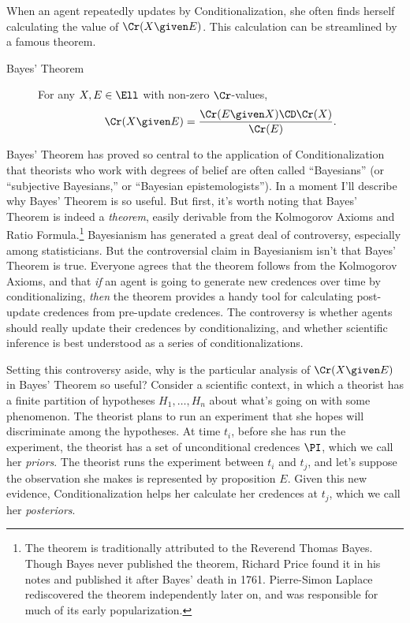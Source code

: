 When an agent repeatedly updates by Conditionalization, she often finds herself calculating the value of $\Cr(X \given E)$. This calculation can be streamlined by a famous theorem.
\begin{description}
\item[Bayes' Theorem]{For any $X, E \in \Ell$ with non-zero $\Cr$-values, $$\Cr(X \given E)=\frac{\Cr(E \given X) \CD \Cr(X)}{\Cr(E)}.$$}
\end{description}
Bayes' Theorem has proved so central to the application of Conditionalization that theorists who work with degrees of belief are often called ``Bayesians'' (or ``subjective Bayesians,'' or ``Bayesian epistemologists''). In a moment I'll describe why Bayes' Theorem is so useful. But first, it's worth noting that Bayes' Theorem is indeed a \emph{theorem}, easily derivable from the Kolmogorov Axioms and Ratio Formula.\footnote
{The theorem is traditionally attributed to the Reverend Thomas Bayes. Though Bayes never published the theorem, Richard Price found it in his notes and published it after Bayes' death in 1761. Pierre-Simon Laplace rediscovered the theorem independently later on, and was responsible for much of its early popularization.} 
 Bayesianism has generated a great deal of controversy, especially among statisticians. But the controversial claim in Bayesianism isn't that Bayes' Theorem is true. Everyone agrees that the theorem follows from the Kolmogorov Axioms, and that \emph{if} an agent is going to generate new credences over time by conditionalizing, \emph{then} the theorem provides a handy tool for calculating post-update credences from pre-update credences. The controversy is whether agents should really update their credences by conditionalizing, and whether scientific inference is best understood as a series of conditionalizations.

Setting this controversy aside, why is the particular analysis of $\Cr(X \given E)$ in Bayes' Theorem so useful? Consider a scientific context, in which a theorist has a finite partition of hypotheses $H_1, \ldots, H_n$ about what's going on with some phenomenon. The theorist plans to run an experiment that she hopes will discriminate among the hypotheses. At time $t_i$, before she has run the experiment, the theorist has a set of unconditional credences $\PI$, which we call her \textit{priors}. The theorist runs the experiment between $t_i$ and $t_j$, and let's suppose the observation she makes is represented by proposition $E$. Given this new evidence, Conditionalization helps her calculate her credences at $t_j$, which we call her \textit{posteriors}.

